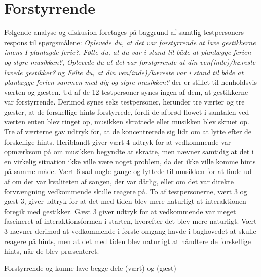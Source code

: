 \section{Forstyrrende}
\label{TestresultaterSocialAcceptForstyrrende}
%
Følgende analyse og diskusion foretages på baggrund af samtlig testpersoners respons til spørgsmålene: \textit{Oplevede du, at det var forstyrrende at lave gestikkerne imens I planlagde ferie?}, \textit{Følte du, at du var i stand til både at planlægge ferien og styre musikken?}, \textit{Oplevede du at det var forstyrrende at din ven(inde)/kæreste lavede gestikker?} og \textit{Følte du, at din ven(inde)/kæreste var i stand til både at planlægge ferien sammen med dig og styre musikken?} der er stillet til henholdsvis værten og gæsten. \blankline
%
Ud af de 12 testpersoner synes ingen af dem, at gestikkerne var forstyrrende. Derimod synes seks testpersoner, herunder tre værter og tre gæster, at de forskellige hints forstyrrede, fordi de afbrød flowet i samtalen ved værten enten blev ringet op, musikken skrattede eller musikken blev skruet op. Tre af værterne gav udtryk for, at de koncentrerede sig lidt om at lytte efter de forskellige hints. Heriblandt giver vært 4 udtryk for at vedkommende var opmærksom på om musikken begyndte at skratte, men nævner samtidig at det i en virkelig situation ikke ville være noget problem, da der ikke ville komme hints på samme måde. Vært 6 sad nogle gange og lyttede til musikken for at finde ud af om det var kvaliteten af sangen, der var dårlig, eller om det var direkte forvrængning vedkommende skulle reagere på. To af testpersonerne, vært 3 og gæst 3, giver udtryk for at det med tiden blev mere naturligt at interaktionen foregik med gestikker. Gæst 3 giver udtryk for at vedkommende var meget fascineret af interaktionsformen i starten, hvorefter det blev mere naturligt. Vært 3 nævner derimod at vedkommende i første omgang havde i baghovedet at skulle reagere på hints, men at det med tiden blev naturligt at håndtere de forskellige hints, når de blev præsenteret. 


Forstyrrende og kunne lave begge dele (vært) og (gæst)